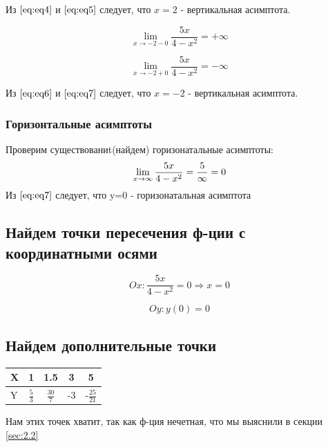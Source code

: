          Из $\eqref{eq:eq4}$ и  $\eqref{eq:eq5}$ следует, что $x = 2$ - вертикальная асимптота.\cite{zorichMath}
            
        \noindent\begin{minipage}{.5\linewidth}
        \begin{equation}
            \label{eq:eq6}
            \lim_{x \to -2-0} \frac{5x}{4-x^2}=+\infty
        \end{equation}
        \end{minipage}
        \begin{minipage}{.5\linewidth}
        \begin{equation}
            \label{eq:eq7}
            \lim_{x \to -2+0} \frac{5x}{4-x^2}=-\infty
        \end{equation}
        \end{minipage}
        \noindent Из $\eqref{eq:eq6}$ и  $\eqref{eq:eq7}$ следует, что $x = -2$ - вертикальная асимптота.
    \subsubsection{Горизонтальные асимптоты}
        Проверим существованиt(найдем) горизонатальные асимптоты:
        \begin{equation}
            \centering
            \label{eq:eq7}
            \lim_{x \to \infty} \frac{5x}{4-x^2}= \frac{5}{\infty} = 0
        \end{equation}
        \noindent Из $\eqref{eq:eq7}$ следует, что y=0 - горизонатальная асимптота
\subsection{Найдем точки пересечения ф-ции с координатными осями}
    \noindent\begin{minipage}{.5\linewidth}
        \begin{equation*}
            Ox:\frac{5x}{4-x^2}=0 \Rightarrow x=0
        \end{equation*}
        \end{minipage}%
        \begin{minipage}{.5\linewidth}
        \begin{equation*}
            Oy: y(0)=0 
        \end{equation*}
        \end{minipage}
\subsection{Найдем дополнительные точки}
	\begin{center}
		\begin{tabular}{|l|c|c|c|c|}
			\hline
			X & 1 & 1.5 & 3 & 5 \\ \hline
			Y & $\frac{5}{3}$ & $\frac{30}{7}$ & -3 & -$\frac{25}{21}$\\ \hline
		\end{tabular}
		\label{tabular:tab}
	\end{center}
	Нам этих точек хватит, так как ф-ция нечетная, что мы выяснили в секции \ref{sec:2.2}
	
